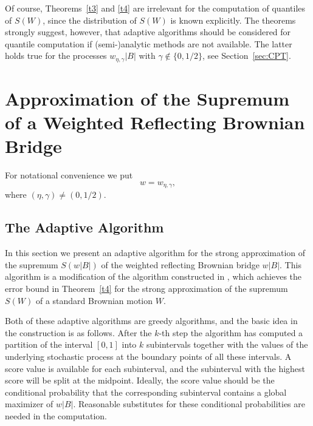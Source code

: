 \documentclass[a4paper]{amsart}
\theoremstyle{definition}
\theoremstyle{plain}
\begin{document}
Of course, Theorems~\ref{t3} and \ref{t4} are irrelevant
for the computation of quantiles of $S(W)$, since the distribution
of $S(W)$ is known explicitly. The theorems strongly suggest, however, that
adaptive algorithms should be considered for quantile computation
if (semi-)analytic methods are not available. The latter holds true for
the processes $w_{\eta,\gamma} |B|$ with $\gamma \not \in \{0,1/2\}$,
see Section~\ref{sec:CPT}.

\section{Approximation of the Supremum
of a Weighted Reflecting Brownian Bridge}\label{s3}

For notational convenience we put
\[
w = w_{\eta,\gamma},
\]
where $(\eta,\gamma) \neq (0,1/2)$.

\subsection{The Adaptive Algorithm}\label{s4.1}

In this section we present an adaptive algorithm for the strong
approximation of the supremum $S(w |B|)$ of the weighted reflecting
Brownian bridge $w|B|$. This algorithm is a modification of
the algorithm constructed in \citet*{MR3605752}, which achieves the error
bound in Theorem~\ref{t4} for the strong approximation of the supremum
$S(W)$ of a standard Brownian motion $W$.

Both of these adaptive algorithms are greedy algorithms,
and the basic idea in the construction is as follows.
After the $k$-th step the algorithm
has computed a partition of the interval $[0,1]$ into
$k$ subintervals together with the values of the underlying stochastic
process at the boundary points of all these intervals.
A score value is available for each subinterval,
and the subinterval with the highest score will
be split at the midpoint. Ideally,
the score value should be the conditional probability that
the corresponding subinterval contains a global maximizer
of $w |B|$. Reasonable substitutes for these conditional probabilities
are needed in the computation.
\end{document}
